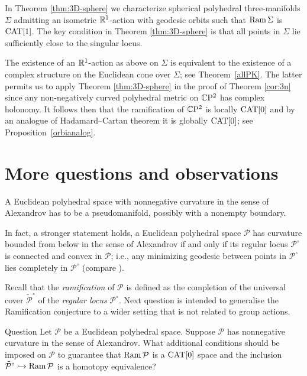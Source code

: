 \documentclass[oneside,a4paper]{article}
\def\Ram{\mathop{\rm Ram}\nolimits}
\begin{document}
In Theorem \ref{thm:3D-sphere} we  characterize  spherical polyhedral three-manifolds $\Sigma$
admitting an isometric $\mathbb{R}^1$-action with geodesic orbits such that $\Ram\Sigma$ is $\mathrm{CAT}[1]$.
The key condition in Theorem \ref{thm:3D-sphere} is that all points in $\Sigma$  lie sufficiently close to the singular locus.

The existence of an $\mathbb{R}^1$-action as above on $\Sigma$ is equivalent to the existence of
a complex structure on the Euclidean cone over $\Sigma$;
see Theorem~\ref{allPK}. 
The latter permits us to apply Theorem \ref{thm:3D-sphere} in the proof of Theorem \ref{cor:3n}
since any non-negatively curved polyhedral metric on $\mathbb{C}\mathrm{P}^2$ has complex holonomy.
It follows then that the ramification of $\mathbb{C}\mathrm{P}^2$ is locally $\mathrm{CAT}[0]$ and by an analogue of Hadamard--Cartan theorem it is globally $\mathrm{CAT}[0]$;
see Proposition~\ref{orbianalog}.





\section{More questions and observations}\label{sec:questions}

A Euclidean polyhedral space with
nonnegative curvature in the sense of Alexandrov has to be a pseudomanifold, possibly with a nonempty boundary.

In fact, a stronger statement holds,
a Euclidean polyhedral space $\mathcal{P}$
has curvature bounded from below in the sense of Alexandrov
if and only if
its regular locus $\mathcal{P}^\circ$
is connected and convex in $\mathcal{P}$;
i.e., any minimizing geodesic between points in $\mathcal{P}^\circ$ lies completely in $\mathcal{P}^\circ$ (compare \cite[Theorem 5]{milka}).

Recall that the {\it ramification} of $\mathcal{P}$
is defined as the  completion of the universal cover $\tilde {\mathcal{P}}^\circ$ of the \emph{regular locus} $\mathcal{P}^\circ$.
Next question is intended to generalise the Ramification conjecture 
to a wider setting that is not related to group actions.


\begin{thm}{Question}\label{quest:generalized}
Let $\mathcal{P}$ be a Euclidean polyhedral space. Suppose $\mathcal{P}$ has nonnegative curvature in the sense of Alexandrov.
What additional conditions should be imposed on $\mathcal{P}$  to guarantee that $\Ram \mathcal{P}$ is a $\mathrm{CAT}[0]$ space
and the inclusion $\tilde{\mathcal{P}}^\circ\hookrightarrow\Ram \mathcal{P}$ is a homotopy equivalence?
\end{thm}
\end{document}
